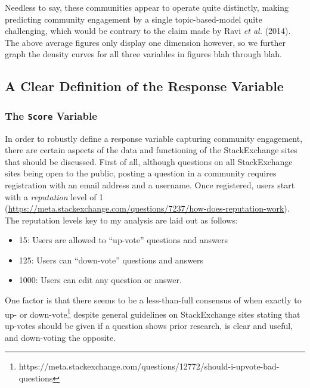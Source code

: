 \documentclass[11pt,preprint, authoryear]{article}
\numberwithin{equation}{section}
\let\rmarkdownfootnote\footnote%
\def\footnote{\protect\rmarkdownfootnote}
\begin{document}
Needless to say, these communities appear to operate quite distinctly,
making predicting community engagement by a single topic-based-model
quite challenging, which would be contrary to the claim made by Ravi
\emph{et al.} (2014). The above average figures only display one
dimension however, so we further graph the density curves for all three
variables in figures blah through blah.

\subsection{A Clear Definition of the Response
Variable}\label{a-clear-definition-of-the-response-variable}

\subsubsection{\texorpdfstring{The \texttt{Score}
Variable}{The Score Variable}}\label{the-score-variable}

In order to robustly define a response variable capturing community
engagement, there are certain aspects of the data and functioning of the
StackExchange sites that should be discussed. First of all, although
questions on all StackExchange sites being open to the public, posting a
question in a community requires registration with an email address and
a username. Once registered, users start with a \emph{reputation} level
of 1
(\url{https://meta.stackexchange.com/questions/7237/how-does-reputation-work}).
The reputation levels key to my analysis are laid out as follows:


\begin{itemize}
\item
  15: Users are allowed to ``up-vote'' questions and answers
\item
  125: Users can ``down-vote'' questions and answers
\item
  1000: Users can edit any question or answer.
\end{itemize}


One factor is that there seems to be a less-than-full consensus of when
exactly to up- or
down-vote\footnote{https://meta.stackexchange.com/questions/12772/should-i-upvote-bad-questions}
despite general guidelines on StackExchange sites stating that up-votes
should be given if a question shows prior research, is clear and useful,
and down-voting the opposite.
\end{document}
